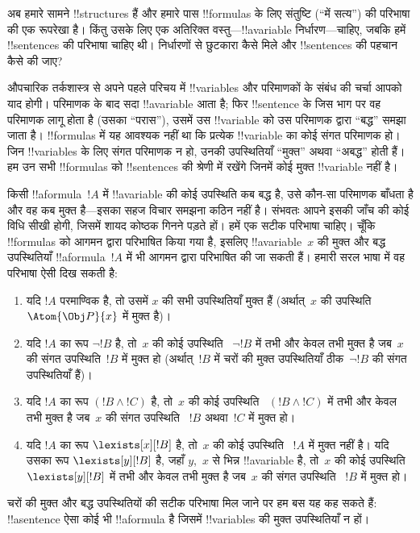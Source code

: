 \documentclass[../../../include/open-logic-section]{subfiles}
\begin{document}


अब हमारे सामने !!{structure}s हैं और हमारे पास !!{formula}s के लिए संतुष्टि
(``में सत्य'') की परिभाषा की एक रूपरेखा है। किंतु उसके लिए एक अतिरिक्त वस्तु---!!a{variable}
निर्धारण---चाहिए, जबकि हमें !!{sentence}s की परिभाषा चाहिए थी। निर्धारणों से
छुटकारा कैसे मिले और !!{sentence}s की पहचान कैसे की जाए?

औपचारिक तर्कशास्त्र से अपने पहले परिचय में !!{variable}s और परिमाणकों के
संबंध की चर्चा आपको याद होगी। परिमाणक के बाद सदा !!a{variable} आता है; फिर
!!{sentence} के जिस भाग पर वह परिमाणक लागू होता है (उसका ``परास''), उसमें उस
!!{variable} को उस परिमाणक द्वारा ``बद्ध'' समझा जाता है। !!{formula}s में यह
आवश्यक नहीं था कि प्रत्येक !!{variable} का कोई संगत परिमाणक हो। जिन
!!{variable}s के लिए संगत परिमाणक न हो, उनकी उपस्थितियाँ ``मुक्त'' अथवा
``अबद्ध'' होती हैं। हम उन सभी !!{formula}s को !!{sentence}s की श्रेणी में
रखेंगे जिनमें कोई मुक्त !!{variable} नहीं है।

किसी !!a{formula}~$!A$ में !!a{variable} की कोई उपस्थिति कब बद्ध है, उसे
कौन-सा परिमाणक बाँधता है और वह कब मुक्त है---इसका सहज विचार समझना कठिन नहीं
है। संभवतः आपने इसकी जाँच की कोई विधि सीखी होगी, जिसमें शायद कोष्ठक गिनने
पड़ते हों। हमें एक सटीक परिभाषा चाहिए। चूँकि !!{formula}s को आगमन द्वारा
परिभाषित किया गया है, इसलिए !!a{variable}~$x$ की मुक्त और बद्ध उपस्थितियाँ
!!a{formula}~$!A$ में भी आगमन द्वारा परिभाषित की जा सकती हैं। हमारी सरल भाषा
में वह परिभाषा ऐसी दिख सकती है:
\begin{enumerate}
  \item यदि $!A$ परमाण्विक है, तो उसमें $x$ की सभी उपस्थितियाँ मुक्त हैं
  (अर्थात्~$x$ की उपस्थिति~$\Atom{\Obj P}{x}$ में मुक्त है)।
  \item यदि $!A$ का रूप $\lnot !B$ है, तो~$x$ की कोई उपस्थिति
  ~$\lnot !B$ में तभी और केवल तभी मुक्त है जब~$x$ की संगत उपस्थिति~$!B$ में
  मुक्त हो (अर्थात्~$
  !B$ में चरों की मुक्त उपस्थितियाँ ठीक~$\lnot !B$ की संगत
  उपस्थितियाँ हैं)।
  \item यदि $!A$ का रूप $(!B \land !C)$ है, तो~$x$ की कोई उपस्थिति
  ~$(!B \land !C)$ में तभी और केवल तभी मुक्त है जब~$x$ की संगत उपस्थिति
  ~$!B$ अथवा~$!C$ में मुक्त हो।
  \item यदि $!A$ का रूप $\lexists[x][!B]$ है, तो~$x$ की कोई उपस्थिति
  ~$!A$ में मुक्त नहीं है। यदि उसका रूप $\lexists[y][!B]$ है, जहाँ $y$,~$x$
  से भिन्न !!a{variable} है, तो~$x$ की कोई उपस्थिति
  $\lexists[y][!B]$ में तभी और केवल तभी मुक्त है जब~$x$ की संगत उपस्थिति
  ~$!B$ में मुक्त हो।
\end{enumerate}

चरों की मुक्त और बद्ध उपस्थितियों की सटीक परिभाषा मिल जाने पर हम बस यह कह
सकते हैं: !!a{sentence} ऐसा कोई भी !!a{formula} है जिसमें !!{variable}s की
मुक्त उपस्थितियाँ न हों।
\end{document}
